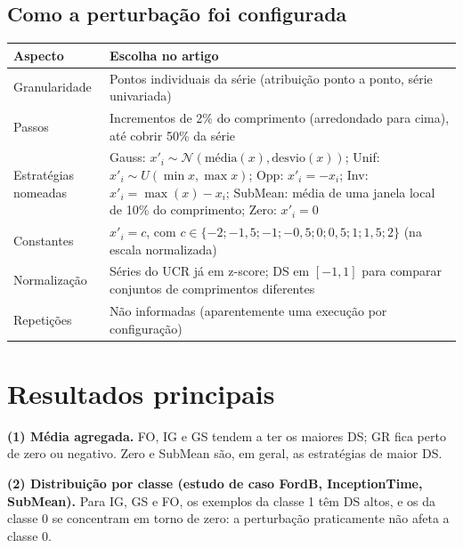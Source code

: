 \documentclass[11pt,a4paper]{article}
\begin{document}
\subsection{Como a perturbação foi configurada}
\begin{center}\small
\begin{tabularx}{\linewidth}{lX}
\toprule
\textbf{Aspecto} & \textbf{Escolha no artigo} \\
\midrule
Granularidade & Pontos individuais da série (atribuição ponto a ponto, série univariada) \\
Passos & Incrementos de 2\% do comprimento (arredondado para cima), até cobrir 50\% da série \\
Estratégias nomeadas & Gauss: $x'_i \sim \mathcal{N}(\text{média}(x), \text{desvio}(x))$; Unif: $x'_i \sim U(\min x, \max x)$; Opp: $x'_i = -x_i$; Inv: $x'_i = \max(x) - x_i$; SubMean: média de uma janela local de 10\% do comprimento; Zero: $x'_i = 0$ \\
Constantes & $x'_i = c$, com $c \in \{-2; -1{,}5; -1; -0{,}5; 0; 0{,}5; 1; 1{,}5; 2\}$ (na escala normalizada) \\
Normalização & Séries do UCR já em z-score; DS em $[-1,1]$ para comparar conjuntos de comprimentos diferentes \\
Repetições & Não informadas (aparentemente uma execução por configuração) \\
\bottomrule
\end{tabularx}
\end{center}

\section{Resultados principais}
\textbf{(1) Média agregada.} FO, IG e GS tendem a ter os maiores DS; GR fica perto de zero ou negativo. Zero e SubMean são, em geral, as estratégias de maior DS.

\textbf{(2) Distribuição por classe (estudo de caso FordB, InceptionTime, SubMean).} Para IG, GS e FO, os exemplos da classe 1 têm DS altos, e os da classe 0 se concentram em torno de zero: a perturbação praticamente não afeta a classe 0.
\end{document}
